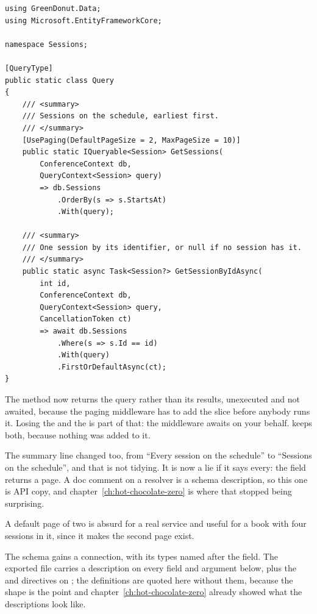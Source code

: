 \begin{verbatim}
using GreenDonut.Data;
using Microsoft.EntityFrameworkCore;

namespace Sessions;

[QueryType]
public static class Query
{
    /// <summary>
    /// Sessions on the schedule, earliest first.
    /// </summary>
    [UsePaging(DefaultPageSize = 2, MaxPageSize = 10)]
    public static IQueryable<Session> GetSessions(
        ConferenceContext db,
        QueryContext<Session> query)
        => db.Sessions
            .OrderBy(s => s.StartsAt)
            .With(query);

    /// <summary>
    /// One session by its identifier, or null if no session has it.
    /// </summary>
    public static async Task<Session?> GetSessionByIdAsync(
        int id,
        ConferenceContext db,
        QueryContext<Session> query,
        CancellationToken ct)
        => await db.Sessions
            .Where(s => s.Id == id)
            .With(query)
            .FirstOrDefaultAsync(ct);
}
\end{verbatim}

%
The method now returns the query rather than its results, unexecuted and not
awaited, because the paging middleware has to add the slice before anybody runs
it. Losing the  and the  is part of that:
the middleware awaits on your behalf.  keeps both,
because nothing was added to it.

The summary line changed too, from \enquote{Every session on the schedule} to
\enquote{Sessions on the schedule}, and that is not tidying. It is now a lie if
it says every: the field returns a page. A doc comment on a resolver is a
schema description, so this one is API copy, and
chapter~\ref{ch:hot-chocolate-zero} is where that stopped being surprising.

A default page of two is absurd for a real service and useful for a book with
four sessions in it, since it makes the second page exist.

The schema gains a connection, with its types named after the field. The
exported file carries a description on every field and argument below, plus the
 and  directives on ; the
definitions are quoted here without them, because the shape is the point and
chapter~\ref{ch:hot-chocolate-zero} already showed what the descriptions look
like.

